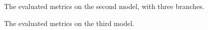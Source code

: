 \documentclass[twocolumn]{article}
\begin{document}
	\begin{figure}[ht]
		\centering
		\caption{The evaluated metrics on the second model, with three branches.}
		\label{fig:model2_2_metrics}
	\end{figure}
	\begin{figure}[ht]
		
		\centering
		\caption{The evaluated metrics on the third model.}
		\label{fig:model3_metrics}
	\end{figure}
\end{document}
